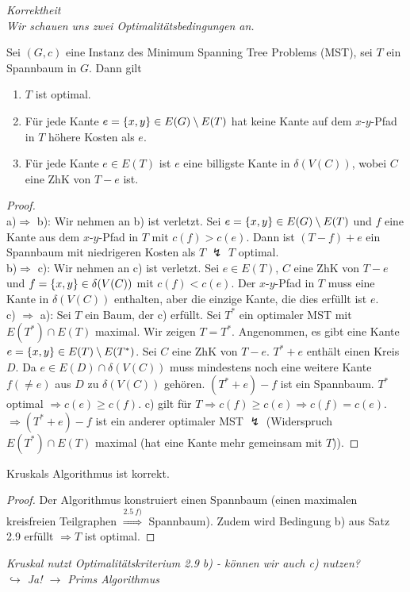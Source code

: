 \textit{Korrektheit\\[5pt]
Wir schauen uns zwei Optimalitätsbedingungen an.}
\begin{satz}
	Sei $(G,c)$ eine Instanz des Minimum Spanning Tree Problems (MST), sei $T$ ein Spannbaum in $G$. Dann gilt
	\begin{enumerate}[label={\alph*)}]
		\item $T$ ist optimal.
		\item Für jede Kante $e=\{x,y\} \in E(G)\setminus E(T)$ hat keine Kante auf dem $x$-$y$-Pfad in $T$ höhere Kosten als $e$.
		\item Für jede Kante $e\in E(T)$ ist $e$ eine billigste Kante in $\delta(V(C))$, wobei $C$ eine ZhK von $T-e$ ist.
	\end{enumerate}
\end{satz}
\begin{proof}~\\
	a)$\Rightarrow$ b): Wir nehmen an b) ist verletzt. Sei $e=\{x,y\} \in E(G)\setminus E(T)$ und $f$ eine Kante aus dem $x$-$y$-Pfad in $T$ mit $c(f) > c(e)$. Dann ist $(T-f)+e$ ein Spannbaum mit niedrigeren Kosten als $T$ $\lightning$ $T$ optimal.\\
	b)$\Rightarrow$ c): Wir nehmen an c) ist verletzt. Sei $e\in E(T)$, $C$ eine ZhK von $T-e$ und $f=\{x,y\} \in \delta(V(C))$ mit $c(f) < c(e)$. Der $x$-$y$-Pfad in $T$ muss eine Kante in $\delta(V(C))$ enthalten, aber die einzige Kante, die dies erfüllt ist $e$.\\
	c) $\Rightarrow$ a): Sei $T$ ein Baum, der c) erfüllt. Sei $T^*$ ein optimaler MST mit $E(T^*)\cap E(T)$ maximal. Wir zeigen $T=T^*$. Angenommen, es gibt eine Kante $e=\{x,y\} \in E(T)\setminus E(T^*)$. Sei $C$ eine ZhK von $T-e$. $T^*+e$ enthält einen Kreis $D$. Da $e\in E(D)\cap \delta(V(C))$ muss mindestens noch eine weitere Kante $f (\neq e)$ aus $D$ zu $\delta(V(C))$ gehören. $(T^*+e)-f$ ist ein Spannbaum. $T^*$ optimal $\Rightarrow c(e)\ge c(f)$. c) gilt für $T \Rightarrow c(f)\ge c(e)\Rightarrow c(f) = c(e)$. $\Rightarrow (T^*+e)-f$ ist ein anderer optimaler MST $\lightning$ (Widerspruch $E(T^*)\cap E(T)$ maximal (hat eine Kante mehr gemeinsam mit $T$)).
\end{proof}
\begin{satz}
	Kruskals Algorithmus ist korrekt.
\end{satz}
\begin{proof}
	Der Algorithmus konstruiert einen Spannbaum (einen maximalen kreisfreien Teilgraphen $\overset{2.5~f)}{\Rightarrow}$ Spannbaum). Zudem wird Bedingung b) aus Satz 2.9 erfüllt $\Rightarrow T$ ist optimal.
\end{proof}
\textit{Kruskal nutzt Optimalitätskriterium 2.9 b) - können wir auch c) nutzen?\\
\hspace*{10pt}$\hookrightarrow$ Ja! $\to$ Prims Algorithmus}
